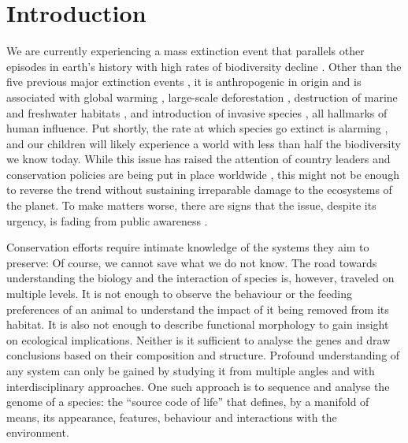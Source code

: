 \chapter{Introduction}
\label{introduction}

We are currently experiencing a mass extinction event that parallels
other episodes in earth's history with high rates of biodiversity
decline \citep{Pimm1995, Dirzo2003, Schipper2008, Barnosky2011,
Dirzo2014}. Other than the five previous major extinction events
\citep{Kolbert2014}, it is anthropogenic in origin \citep{Leakey1996,
Ceballos2015} and is associated with global warming \citep{Cook2016,
Wuebbles2017}, large-scale deforestation \citep{Wright2005}, destruction
of marine and freshwater habitats \citep{Burkhead2012}, and introduction
of invasive species \citep{Mooney2001}, all hallmarks of human
influence. Put shortly, the rate at which species go extinct is alarming
\citep{Newbold2016, Ceballos2017, Hallmann2017}, and our children will
likely experience a world with less than half the biodiversity we know
today. While this issue has raised the attention of country leaders and
conservation policies are being put in place worldwide
\citep{Puntaru2017}, this might not be enough to reverse the trend
without sustaining irreparable damage to the ecosystems of the planet.
To make matters worse, there are signs that the issue, despite its
urgency, is fading from public awareness \citep{Kusmanoff2017}. 

Conservation efforts require intimate knowledge of the systems they aim
to preserve: Of course, we cannot save what we do not know. The road
towards understanding the biology and the interaction of species is,
however, traveled on multiple levels. It is not enough to observe the
behaviour or the feeding preferences of an animal to understand the
impact of it being removed from its habitat. It is also not enough to
describe functional morphology to gain insight on ecological
implications. Neither is it sufficient to analyse the genes and draw
conclusions based on their composition and structure. Profound
understanding of any system can only be gained by studying it from
multiple angles and with interdisciplinary approaches. One such approach
is to sequence and analyse the genome of a species: the ``source code of
life'' that defines, by a manifold of means, its appearance, features,
behaviour and interactions with the environment.


